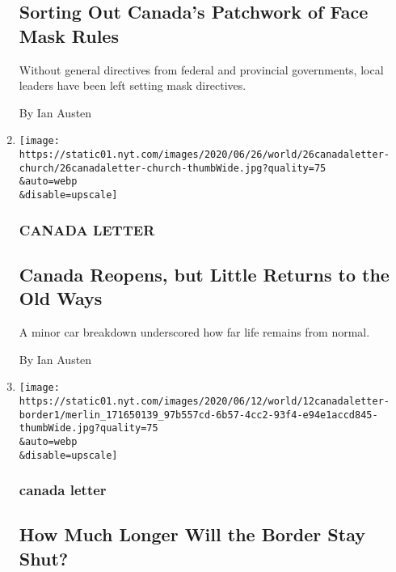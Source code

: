 \begin{enumerate}
  \hypertarget{sorting-out-canadas-patchwork-of-face-mask-rules}{%
  \subsection{Sorting Out Canada's Patchwork of Face Mask
  Rules}\label{sorting-out-canadas-patchwork-of-face-mask-rules}}

  Without general directives from federal and provincial governments,
  local leaders have been left setting mask directives.

  By Ian Austen
\item
  \href{/2020/06/26/world/canada/canada-reopens-but-little-returns-to-the-old-ways.html}{}

  \texttt{[image: https://static01.nyt.com/images/2020/06/26/world/26canadaletter-church/26canadaletter-church-thumbWide.jpg?quality=75\\\&auto=webp\\\&disable=upscale]}

  \hypertarget{canada-letter-4}{%
  \subsubsection{CANADA LETTER}\label{canada-letter-4}}

  \hypertarget{canada-reopens-but-little-returns-to-the-old-ways}{%
  \subsection{Canada Reopens, but Little Returns to the Old
  Ways}\label{canada-reopens-but-little-returns-to-the-old-ways}}

  A minor car breakdown underscored how far life remains from normal.

  By Ian Austen
\item
  \href{/2020/06/12/world/canada/us-canadian-border.html}{}

  \texttt{[image: https://static01.nyt.com/images/2020/06/12/world/12canadaletter-border1/merlin\_171650139\_97b557cd-6b57-4cc2-93f4-e94e1accd845-thumbWide.jpg?quality=75\\\&auto=webp\\\&disable=upscale]}

  \hypertarget{canada-letter-5}{%
  \subsubsection{canada letter}\label{canada-letter-5}}

  \hypertarget{how-much-longer-will-the-border-stay-shut}{%
  \subsection{How Much Longer Will the Border Stay
  Shut?}\label{how-much-longer-will-the-border-stay-shut}}


\end{enumerate}
